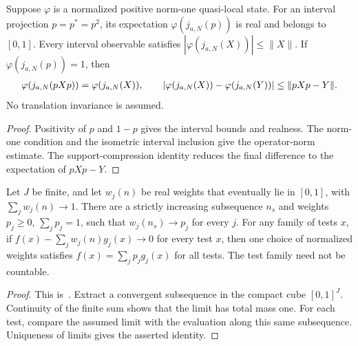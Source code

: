 \begin{lemma}
    \label{thm:interval_state_projection_estimates}
    \leanok
    Suppose $\varphi$ is a normalized positive norm-one quasi-local state.
    For an interval projection $p=p^*=p^2$, its expectation
    $\varphi(j_{a,N}(p))$ is real and belongs to $[0,1]$.
    Every interval observable satisfies
    $|\varphi(j_{a,N}(X))|\leq\|X\|$.
    If $\varphi(j_{a,N}(p))=1$, then
    \begin{align}
        \varphi(j_{a,N}(pXp))=\varphi(j_{a,N}(X)),\qquad
        |\varphi(j_{a,N}(X))-\varphi(j_{a,N}(Y))|
        \leq\|pXp-Y\|.
        \notag
    \end{align}
    No translation invariance is assumed.
\end{lemma}
\begin{proof}\leanok
    Positivity of $p$ and $1-p$ gives the interval bounds and realness.
    The norm-one condition and the isometric interval inclusion give the
    operator-norm estimate. The support-compression identity reduces the
    final difference to the expectation of $pXp-Y$.
\end{proof}

\begin{lemma}
    \label{thm:finite_convex_weights_compactness}
    \leanok
    Let $J$ be finite, and let $w_j(n)$ be real weights that eventually lie
    in $[0,1]$, with $\sum_jw_j(n)\to1$. There are a strictly increasing
    subsequence $n_s$ and weights $p_j\geq0$, $\sum_jp_j=1$, such that
    $w_j(n_s)\to p_j$ for every $j$.
    For any family of tests $x$, if
    $f(x)-\sum_jw_j(n)g_j(x)\longrightarrow0$ for every test $x$,
    then one choice of normalized weights satisfies
    $f(x)=\sum_jp_jg_j(x)$ for all tests. The test family need not be countable.
\end{lemma}
\begin{proof}\leanok
    This is~\cite[``Compactness of finite convex
        weights'']{QICLean2026Blueprint}.
    Extract a convergent subsequence in the compact cube $[0,1]^J$.
    Continuity of the finite sum shows that the limit has total mass one.
    For each test, compare the assumed limit with the evaluation along
    this same subsequence. Uniqueness of limits gives the asserted identity.
\end{proof}

